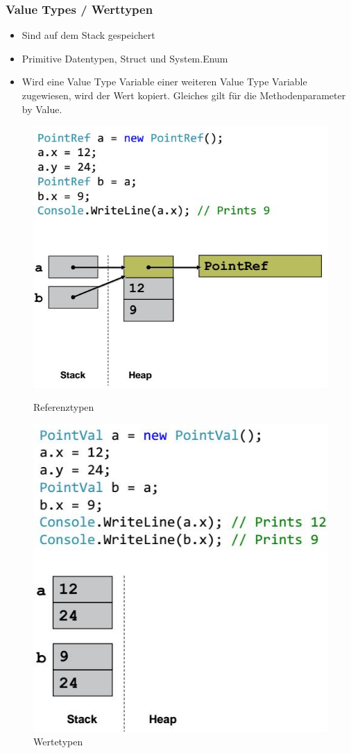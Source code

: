 \subsubsection{Value Types / Werttypen}
\begin{itemize}
	\item Sind auf dem Stack gespeichert
	\item Primitive Datentypen, Struct und System.Enum
	\item Wird eine Value Type Variable einer weiteren Value Type Variable zugewiesen, wird der Wert kopiert. Gleiches gilt für die Methodenparameter by Value.
\end{itemize}

\begin{figure}[ht!]
	\centering
	\begin{minipage}[t]{0.4\textwidth}
		\centering
		\includegraphics[width=0.8\linewidth]{images/reference_types}
		\caption{Referenztypen}
		\label{fig:searchtreeinsert1}
	\end{minipage}
	\begin{minipage}[t]{0.4\textwidth}
		\centering
		\includegraphics[width=0.8\linewidth]{images/value_types}
		\caption{Wertetypen}
		\label{fig:searchtreeinsert2}
	\end{minipage}
\end{figure}

